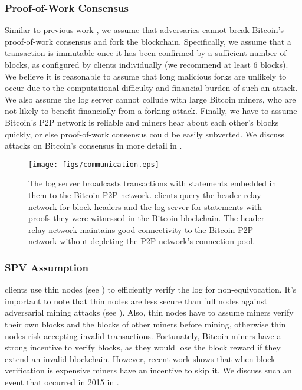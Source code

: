 \subsubsection{Proof-of-Work Consensus}
\label{sec:model:threat:pow}
Similar to previous work \cite{virtualchain, blockstack, keybase, bitcoin-smc, bitcoin-anon-cred, versum, bitcoin-incent-comp, bitcoin-pred-mkt,commitcoin}, we assume that adversaries cannot break Bitcoin's proof-of-work consensus and fork the blockchain.
Specifically, we assume that a \Sys transaction is immutable once it has been confirmed by a sufficient number of blocks, as configured by \Sys clients individually (we recommend at least 6 blocks).
We believe it is reasonable to assume that long malicious forks are unlikely to occur due to the computational difficulty and financial burden of such an attack.
We also assume the \Sys log server cannot collude with large Bitcoin miners, who are not likely to benefit financially from a forking attack.
Finally, we have to assume Bitcoin's P2P network is reliable and miners hear about each other's blocks quickly, or else proof-of-work consensus could be easily subverted\cite{blockchainproto,eclipse}.
We discuss attacks on Bitcoin's consensus in more detail in .


\begin{figure}[t]
    \centering
    \texttt{[image: figs/communication.eps]}
    \vspace{-1.2cm}
    \caption{The log server broadcasts \Sys transactions with statements embedded in them to the Bitcoin P2P network. \Sys clients query the header relay network for block headers and the log server for statements with proofs they were witnessed in the Bitcoin blockchain. The header relay network maintains good connectivity to the Bitcoin P2P network without depleting the P2P network's connection pool.}
    \label{fig:communication}
\end{figure}

\subsubsection{SPV Assumption}
\Sys clients use thin nodes (see ) to efficiently verify the log for non-equivocation.
It's important to note that thin nodes are less secure than full nodes against adversarial mining attacks (see ).
Also, thin nodes have to assume miners verify their own blocks and the blocks of other miners before mining, otherwise thin nodes risk accepting invalid transactions.
Fortunately, Bitcoin miners have a strong incentive to verify blocks, as they would lose the block reward if they extend an invalid blockchain.
However, recent work\cite{consensuscomputer} shows that when block verification is expensive miners have an incentive to skip it.
We discuss such an event that occurred in 2015 in .


